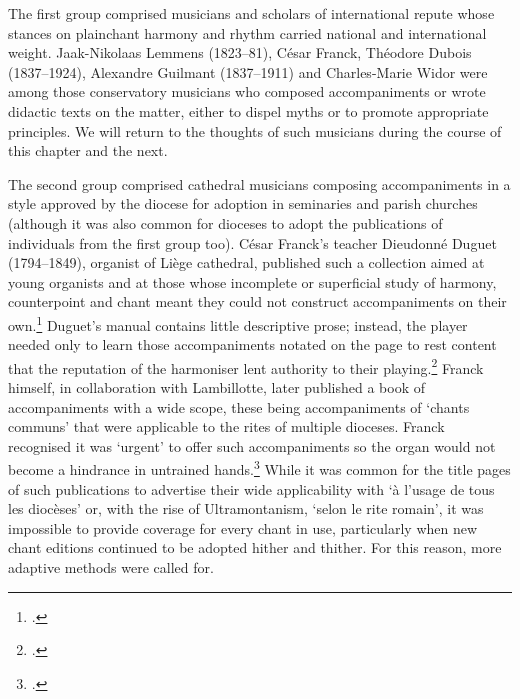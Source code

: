 The first group comprised musicians and scholars of international repute whose stances on plainchant harmony and rhythm carried national and international weight.
Jaak-Nikolaas Lemmens (1823--81), César Franck, Théodore Dubois (1837--1924), Alexandre Guilmant (1837--1911) and Charles-Marie Widor were among those conservatory musicians who composed accompaniments or wrote didactic texts on the matter, either to dispel myths or to promote appropriate principles.
We will return to the thoughts of such musicians during the course of this chapter and the next.

The second group comprised cathedral musicians composing accompaniments in a style approved by the diocese for adoption in seminaries and parish churches (although it was also common for dioceses to adopt the publications of individuals from the first group too).
César Franck's teacher Dieudonné Duguet (1794--1849), organist of Liège cathedral, published such a collection aimed at young organists and at those whose incomplete or superficial study of harmony, counterpoint and chant meant they could not construct accompaniments on their own.\footcites[173]{OchseOrganistsOrganPlaying2000}[3]{DuguetLivreorguecontenant}
Duguet's manual contains little descriptive prose; instead, the player needed only to learn those accompaniments notated on the page to rest content that the reputation of the harmoniser lent authority to their playing.\footcite[468]{Nouvelleslitteraires1848}
Franck himself, in collaboration with Lambillotte, later published a book of accompaniments with a wide scope, these being accompaniments of `chants communs' that were applicable to the rites of multiple dioceses.
Franck recognised it was `urgent' to offer such accompaniments so the organ would not become a hindrance in untrained hands.\footcites[p. iii]{LambillotteChantgregorien1857}[17]{SmithPlayingOrganWorks1997}
While it was common for the title pages of such publications to advertise their wide applicability with `à l'usage de tous les diocèses' or, with the rise of Ultramontanism, `selon le rite romain', it was impossible to provide coverage for every chant in use, particularly when new chant editions continued to be adopted hither and thither.
For this reason, more adaptive methods were called for.
\nowidow[2]

